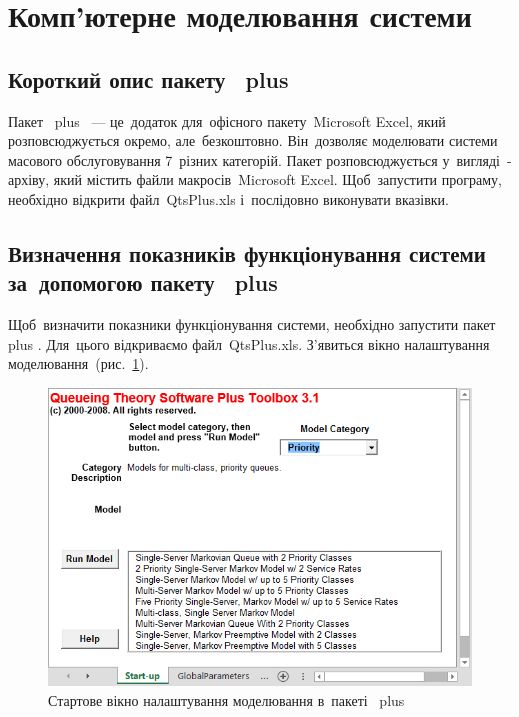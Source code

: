 \documentclass[
  ukrainian,
  simple,
  floatsection,
]{eskdnaukvd}
\begin{document}
  \section{Комп'ютерне моделювання системи}

    \subsection{Короткий опис пакету~\textenglish{ plus }}
      Пакет~\textenglish{ plus }~— це~додаток для~офісного пакету~\textenglish{Microsoft Excel}, який розповсюджується окремо, але~безкоштовно. Він~дозволяє моделювати системи масового обслуговування 7~різних категорій. Пакет розповсюджується у~вигляді~\textenglish{}-архіву, який містить файли макросів~\textenglish{Microsoft Excel}. Щоб~запустити програму, необхідно відкрити файл~\textenglish{QtsPlus.xls} і~послідовно виконувати вказівки.

    \subsection{Визначення показників функціонування системи за~допомогою пакету~\textenglish{ plus }}
      Щоб~визначити показники функціонування системи, необхідно запустити пакет~\textenglish{ plus }. Для~цього відкриваємо файл~\textenglish{QtsPlus.xls}. З'явиться вікно налаштування моделювання~(рис.~\ref{fig:qts-main}).

      \begin{figure}[!htbp]
        \centering
        \includegraphics[height = 10 \baselineskip]{./assets/01-qts-main.png}
        \caption{Стартове вікно налаштування моделювання в~пакеті~\textenglish{ plus }}
        \label{fig:qts-main}
      \end{figure}
\end{document}

